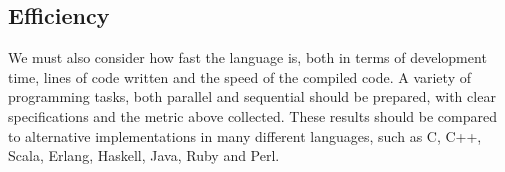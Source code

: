 \documentclass[pdftex,11pt,a4paper]{report}
\begin{document}
\subsection{Efficiency}

We must also consider how fast the language is, both in terms of development time, lines of code written and the speed of the compiled code.
A variety of programming tasks, both parallel and sequential should be prepared, with clear specifications and the metric above collected.
These results should be compared to alternative implementations in many different languages, such as C, C++, Scala, Erlang, Haskell, Java, Ruby and Perl.



\end{document}
